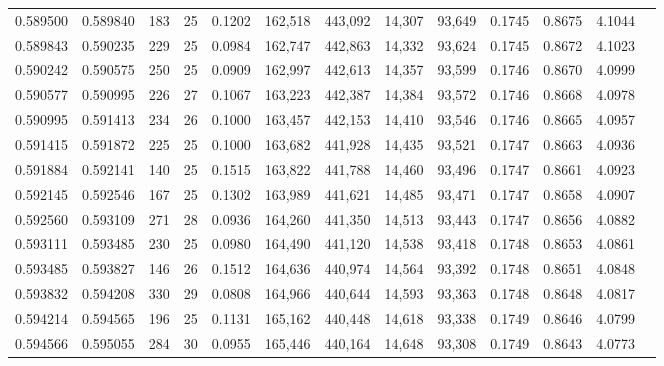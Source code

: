 \begin{tabular}{rrrrrrrrrrrrr}
0.589500 & 0.589840 &   183 &  25 &                                     0.1202 & 162,518 & 443,092 &  14,307 &  93,649 & 0.1745 & 0.8675 & 4.1044 \\
0.589843 & 0.590235 &   229 &  25 &                                     0.0984 & 162,747 & 442,863 &  14,332 &  93,624 & 0.1745 & 0.8672 & 4.1023 \\
0.590242 & 0.590575 &   250 &  25 &                                     0.0909 & 162,997 & 442,613 &  14,357 &  93,599 & 0.1746 & 0.8670 & 4.0999 \\
0.590577 & 0.590995 &   226 &  27 &                                     0.1067 & 163,223 & 442,387 &  14,384 &  93,572 & 0.1746 & 0.8668 & 4.0978 \\
0.590995 & 0.591413 &   234 &  26 &                                     0.1000 & 163,457 & 442,153 &  14,410 &  93,546 & 0.1746 & 0.8665 & 4.0957 \\
0.591415 & 0.591872 &   225 &  25 &                                     0.1000 & 163,682 & 441,928 &  14,435 &  93,521 & 0.1747 & 0.8663 & 4.0936 \\
0.591884 & 0.592141 &   140 &  25 &                                     0.1515 & 163,822 & 441,788 &  14,460 &  93,496 & 0.1747 & 0.8661 & 4.0923 \\
0.592145 & 0.592546 &   167 &  25 &                                     0.1302 & 163,989 & 441,621 &  14,485 &  93,471 & 0.1747 & 0.8658 & 4.0907 \\
0.592560 & 0.593109 &   271 &  28 &                                     0.0936 & 164,260 & 441,350 &  14,513 &  93,443 & 0.1747 & 0.8656 & 4.0882 \\
0.593111 & 0.593485 &   230 &  25 &                                     0.0980 & 164,490 & 441,120 &  14,538 &  93,418 & 0.1748 & 0.8653 & 4.0861 \\
0.593485 & 0.593827 &   146 &  26 &                                     0.1512 & 164,636 & 440,974 &  14,564 &  93,392 & 0.1748 & 0.8651 & 4.0848 \\
0.593832 & 0.594208 &   330 &  29 &                                     0.0808 & 164,966 & 440,644 &  14,593 &  93,363 & 0.1748 & 0.8648 & 4.0817 \\
0.594214 & 0.594565 &   196 &  25 &                                     0.1131 & 165,162 & 440,448 &  14,618 &  93,338 & 0.1749 & 0.8646 & 4.0799 \\
0.594566 & 0.595055 &   284 &  30 &                                     0.0955 & 165,446 & 440,164 &  14,648 &  93,308 & 0.1749 & 0.8643 & 4.0773 \\

\end{tabular}
